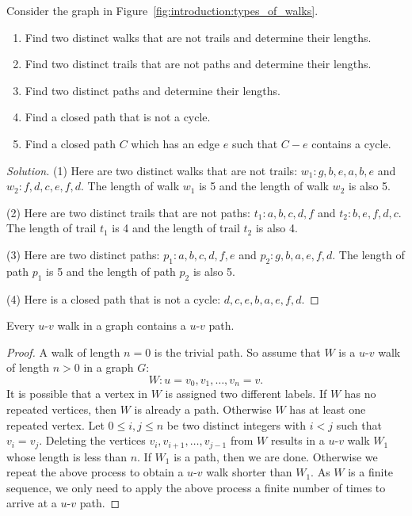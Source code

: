 \begin{example}
Consider the graph in Figure~\ref{fig:introduction:types_of_walks}.
%
\begin{enumerate}
\item Find two distinct walks that are not trails and determine their
  lengths.

\item Find two distinct trails that are not paths and determine their
  lengths.

\item Find two distinct paths and determine their lengths.

\item Find a closed path that is not a cycle.

\item Find a closed path $C$ which has an edge $e$ such that $C - e$
  contains a cycle.
\end{enumerate}
\end{example}

\begin{proof}[Solution]
(1) Here are two distinct walks that are not trails:
$w_1: g, b, e, a, b, e$ and $w_2: f, d, c, e, f, d$. The length of
walk $w_1$ is 5 and the length of walk $w_2$ is also 5.

(2) Here are two distinct trails that are not paths:
$t_1: a, b, c, d, f$ and $t_2: b, e, f, d, c$. The length of trail
$t_1$ is 4 and the length of trail $t_2$ is also 4.

(3) Here are two distinct paths: $p_1: a, b, c, d, f, e$ and
$p_2: g, b, a, e, f, d$. The length of path $p_1$ is 5 and the length
of path $p_2$ is also 5.

(4) Here is a closed path that is not a cycle: $d, c, e, b, a, e, f, d$.
\end{proof}

\begin{theorem}
\label{thm:introduction:every_walk_has_a_path}
Every $u$-$v$ walk in a graph contains a $u$-$v$ path.
\end{theorem}

\begin{proof}
A walk of length $n = 0$ is the trivial path. So assume that $W$ is a
$u$-$v$ walk of length $n > 0$ in a graph $G$:
\[
W: u = v_0, v_1, \dots, v_n = v.
\]
It is possible that a vertex in $W$ is assigned two different
labels. If $W$ has no repeated vertices, then $W$ is already a
path. Otherwise $W$ has at least one repeated vertex. Let
$0 \leq i,j \leq n$ be two distinct integers with $i < j$ such that
$v_i = v_j$. Deleting the vertices $v_i, v_{i+1}, \dots, v_{j-1}$ from
$W$ results in a $u$-$v$ walk $W_1$ whose length is less than $n$. If
$W_1$ is a path, then we are done. Otherwise we repeat the above
process to obtain a $u$-$v$ walk shorter than $W_1$. As $W$ is a
finite sequence, we only need to apply the above process a finite
number of times to arrive at a $u$-$v$ path.
\end{proof}


